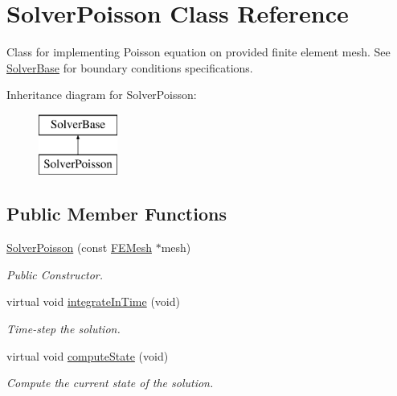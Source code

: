 \hypertarget{class_solver_poisson}{}\section{Solver\+Poisson Class Reference}
\label{class_solver_poisson}


Class for implementing Poisson equation on provided finite element mesh. See \mbox{\hyperlink{class_solver_base}{Solver\+Base}} for boundary conditions specifications.  


Inheritance diagram for Solver\+Poisson\+:\begin{figure}[H]
\begin{center}
\leavevmode
\includegraphics[height=2.000000cm]{class_solver_poisson}
\end{center}
\end{figure}
\subsection*{Public Member Functions}
\begin{DoxyCompactItemize}
\item 
\mbox{\hyperlink{class_solver_poisson_a7e4c1e8605790e219590214893f916b5}{Solver\+Poisson}} (const \mbox{\hyperlink{class_f_e_mesh}{F\+E\+Mesh}} $\ast$mesh)
\begin{DoxyCompactList}\small\item\em Public Constructor. \end{DoxyCompactList}\item 
virtual void \mbox{\hyperlink{class_solver_poisson_a4ff8a1c96b933bc01fdd411d3ae45f20}{integrate\+In\+Time}} (void)
\begin{DoxyCompactList}\small\item\em Time-\/step the solution. \end{DoxyCompactList}\item 
virtual void \mbox{\hyperlink{class_solver_poisson_a1955e79999fcf055aebad5b15fda1563}{compute\+State}} (void)
\begin{DoxyCompactList}\small\item\em Compute the current state of the solution. \end{DoxyCompactList}\end{DoxyCompactItemize}


